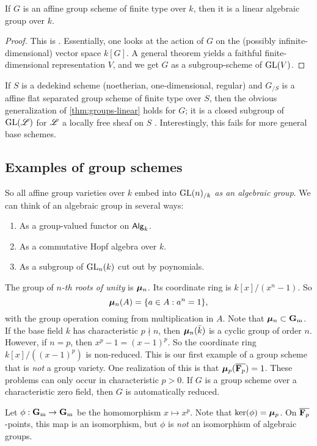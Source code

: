 \begin{theorem}\label{thm:groups-linear}
If $G$ is an affine group scheme of finite type over $k$, then it is a 
linear algebraic group over $k$. 
\end{theorem}
\begin{proof}
This is \cite[VI\textsubscript{B} 11.11]{sga3-i}. Essentially, one looks at the 
action of $G$ 
on the (possibly infinite-dimensional) vector space $k[G]$. A general theorem 
yields a faithful finite-dimensional representation $V$, and we get $G$ as a 
subgroup-scheme of $\operatorname{GL}(V)$. 
\end{proof}

\begin{hard}
If $S$ is a dedekind scheme (noetherian, one-dimensional, regular) and $G_{/S}$ 
is a affine flat separated group scheme of finite type over $S$, then the 
obvious generalization of \autoref{thm:groups-linear} holds for $G$; it is a 
closed subgroup of $\operatorname{GL}(\mathscr{L})$ for $\mathscr{L}$ a locally free sheaf on $S$ 
\cite[VI\textsubscript{B} 13.5]{sga3-i}. 
Interestingly, this fails for more general base schemes. 
\end{hard}





\subsection{Examples of group schemes}

So all affine group varieties over $k$ embed into $\operatorname{GL}(n)_{/k}$ \emph{as an 
algebraic group}. We can think of an algebraic group in several ways: 
\begin{enumerate}
  \item As a group-valued functor on $\mathsf{Alg}_{k}$. 
  \item As a commutative Hopf algebra over $k$. 
  \item As a subgroup of $\operatorname{GL}_n(k)$ cut out by poynomials. 
\end{enumerate}

\begin{example}
The group of \emph{$n$-th roots of unity} is $\bm{\mu}_n$. Its coordinate ring is 
$k[x]/(x^n-1)$. So 
\[
  \bm{\mu}_n(A) = \{a\in A:a^n=1\} ,
\]
with the group operation coming from multiplication in $A$. Note that 
$\bm{\mu}_n\subset \mathbf{G}_\mathrm{m}$. If the base field $k$ has characteristic 
$p\nmid n$, then $\bm{\mu}_n(\bar k)$ is a cyclic group of order $n$. However, if 
$n=p$, then $x^p-1=(x-1)^p$. So the coordinate ring 
$k[x]/((x-1)^p)$ is non-reduced. This is our first example of a group scheme 
that is \emph{not} a group variety. One realization of this is that 
$\bm{\mu}_p(\overline{\mathbf{F}_p})=1$. These problems can only occur in characteristic 
$p>0$. If $G$ is a group scheme over a characteristic zero field, then 
$G$ is automatically reduced. 

Let $\phi:\mathbf{G}_\mathrm{m}\to \mathbf{G}_\mathrm{m}$ be the homomorphism $x\mapsto x^p$. Note that 
$\ker(\phi)=\bm{\mu}_p$. On $\overline{\mathbf{F}_p}$-points, this map is an isomorphism, 
but $\phi$ is \emph{not} an isomorphism of algebraic groups. 
\end{example}


